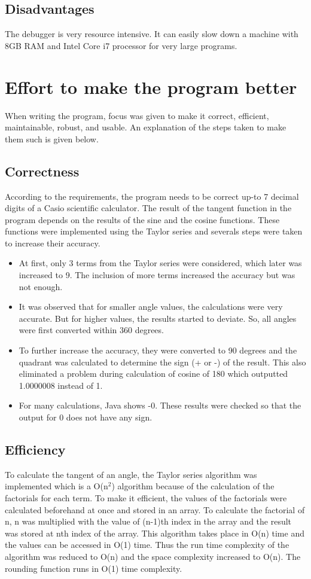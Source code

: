 \documentclass[12pt]{article}
\begin{document}
\subsection{Disadvantages}
The debugger is very resource intensive. It can easily slow down a machine with 8GB RAM and Intel Core i7 processor for very large programs.
\section{Effort to make the program better}
When writing the program, focus was given to make it correct, efficient, maintainable, robust, and usable. An explanation of the steps taken to make them such is given below.
\subsection{Correctness}
According to the requirements, the program needs to be correct up-to 7 decimal digits of a Casio scientific calculator. The result of the tangent function in the program depends on the results of the sine and the cosine functions. These functions were implemented using the Taylor series and severals steps were taken to increase their accuracy. 
\begin{itemize}
    \item At first, only 3 terms from the Taylor series were considered, which later was increased to 9. The inclusion of more terms  increased the accuracy but was not enough.
    \item It was observed that for smaller angle values, the calculations were very accurate. But for higher values, the results started to deviate. So, all angles were first converted within 360 degrees. 
    \item To further increase the accuracy, they were converted to 90 degrees and the quadrant was calculated to determine the sign (+ or -) of the result. This also eliminated a problem during calculation of cosine of 180 which outputted 1.0000008 instead of 1.
    \item For many calculations, Java shows -0. These results were checked so that the output for 0 does not have any sign.
\end{itemize}
\subsection{Efficiency}
To calculate the tangent of an angle, the Taylor series algorithm was implemented which is a O(n$^2$) algorithm because of the calculation of the factorials for each term. To make it efficient, the values of the factorials were calculated beforehand at once and stored in an array. To calculate the factorial of n, n was multiplied with the value of (n-1)th index in the array and the result was stored at nth index of the array. This algorithm takes place in O(n) time and the values can be accessed in O(1) time. Thus the run time complexity of the algorithm was reduced to O(n) and the space complexity increased to O(n). The rounding function runs in O(1) time complexity.
\end{document}
